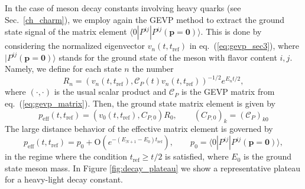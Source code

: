 In the case of meson decay constants involving heavy quarks (see Sec.~\ref{ch_charm}), we employ again the GEVP method to extract the ground state signal of the matrix element $ \langle 0 | P^{ij} | P^{ij}(\mathbf{p=0})\rangle $. This is done by considering the normalized eigenvector $v_n(t,t_{\mathrm{ref}})$ in eq.~(\ref{eq:gevp_sec3}),
where $| P^{ij}(\mathbf{p=0})\rangle$ stands for the ground state of the meson with flavor content $i,j$.  Namely, we define for each state $n$ the number \cite{Blossier:2009kd}
\begin{equation}
	R_n = \left(v_n(t,t_{\mathrm{ref}}),\mathit{\mathcal{C}}_{P}(t)v_n(t,t_{\mathrm{ref}})\right)^{-1/2} e^{E_nt/2},
	\label{eq:gevp_effective_operator}
\end{equation}
where $(\cdot, \cdot)$ is the usual scalar product and $\mathit{\mathcal{C}}_{P}$ is the GEVP matrix from eq.~(\ref{eq:gevp_matrix}).  Then, the ground state matrix element is given by
\begin{equation}
	p_{\mathrm{eff}}(t,t_{\mathrm{ref}}) = (v_0(t,t_{\mathrm{ref}}), C_{P,0}) R_0, \qquad (C_{P,0})_k = (\mathit{\mathcal{C}}_{P})_{k0} 
	\label{eq:effective_matrix_element}
\end{equation}
The large distance behavior of the effective matrix element is governed by 
\begin{equation}
	p_{\mathrm{eff}}(t,t_{\mathrm{ref}}) = p_0 + \mbox{O}(e^{-(E_{N+1}-E_0) t_{\mathrm{ref}}}), \qquad p_0 =  \langle 0 | P^{ij} | P^{ij}(\mathbf{p=0})\rangle,
\end{equation}
in the regime where the condition $t_{\mathrm{ref}}\geq t/2$ is satisfied, where $E_0$ is the ground state meson mass. In Figure \ref{fig:decay_plateau} we show a representative plateau for a heavy-light decay constant.

